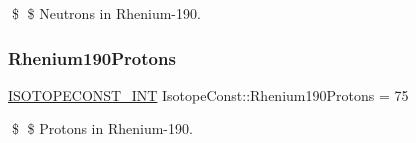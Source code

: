 \$ \$ Neutrons in Rhenium-\/190. \mbox{\label{group___isotope_const-_rhenium-_re190_ga1dc861d52c5c6a89d4ef890e32af6dec}} 
\subsubsection{\texorpdfstring{Rhenium190\+Protons}{Rhenium190Protons}}
{\footnotesize\ttfamily \mbox{\hyperlink{group___isotope_const-_macros_ga5f18360b3e99483a35c32d789e62621c}{I\+S\+O\+T\+O\+P\+E\+C\+O\+N\+S\+T\+\_\+\+I\+NT}} Isotope\+Const\+::\+Rhenium190\+Protons = 75}

\$ \$ Protons in Rhenium-\/190. 